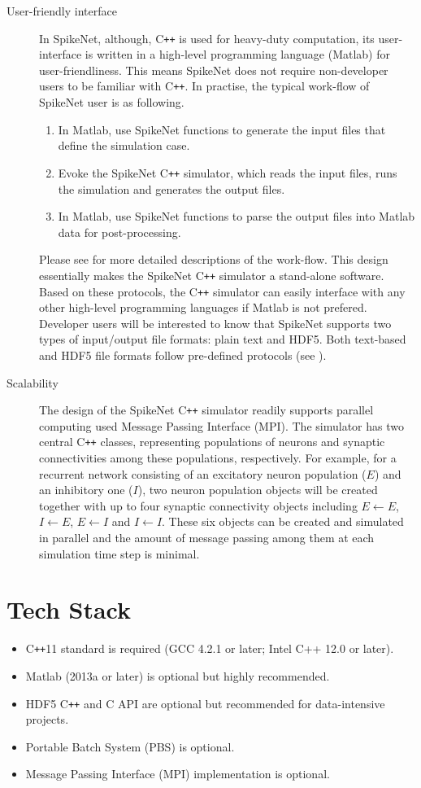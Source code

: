 \documentclass{article}
\begin{document}
\begin{description}
\item [User-friendly interface] In SpikeNet, although, C\texttt{++}  is used for heavy-duty computation, its user-interface is written in a high-level programming language (Matlab) for user-friendliness. This means SpikeNet does not require non-developer users to be familiar with C\texttt{++}. In practise, the typical work-flow of SpikeNet user is as following.
\begin{enumerate}
\item In Matlab, use SpikeNet functions to generate the input files that define the simulation case.
\item Evoke the SpikeNet C\texttt{++} simulator, which reads the input files, runs the simulation and generates the output files.
\item In Matlab, use SpikeNet functions to parse the output files into Matlab data for post-processing.
\end{enumerate}
Please see  for more detailed descriptions of the work-flow. 
This design essentially makes the SpikeNet C\texttt{++} simulator a stand-alone software. 
Based on these protocols, the C\texttt{++} simulator can easily interface with any other high-level programming languages if Matlab is not prefered.
Developer users will be interested to know that SpikeNet supports two types of input/output file formats: plain text and HDF5.
Both text-based and HDF5 file formats follow pre-defined protocols (see ). 

\item [Scalability] The design of the SpikeNet C\texttt{++} simulator readily supports parallel computing used Message Passing Interface (MPI). The simulator has two central C\texttt{++} classes, representing populations of neurons and synaptic connectivities among these populations, respectively. For example, for a recurrent network consisting of an excitatory neuron population ($E$) and an inhibitory one ($I$), two neuron population objects will be created together with up to four synaptic connectivity objects including $E\leftarrow E$, $I\leftarrow E$, $E\leftarrow I$ and $I\leftarrow I$. These six objects can be created and simulated in parallel and the amount of message passing among them at each simulation time step is minimal.  
\end{description}
 
\section{Tech Stack}
\begin{itemize}
\item C\texttt{++}11 standard is required (GCC 4.2.1 or later; Intel C++ 12.0 or later).
\item Matlab (2013a or later) is optional but highly recommended.
\item HDF5 C\texttt{++} and C API are optional but recommended for data-intensive projects.
\item Portable Batch System (PBS) is optional.
\item Message Passing Interface (MPI) implementation is optional.
\end{itemize}
 
\end{document}
